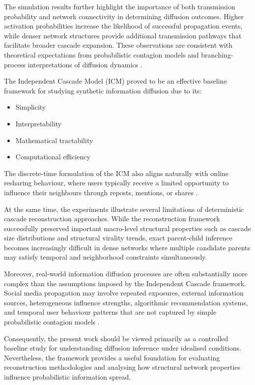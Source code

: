 \documentclass{article}
\begin{document}
\begin{enumerate}
The simulation results further highlight the importance of both transmission probability and network connectivity in determining diffusion outcomes. Higher activation probabilities increase the likelihood of successful propagation events, while denser network structures provide additional transmission pathways that facilitate broader cascade expansion. These observations are consistent with theoretical expectations from probabilistic contagion models and branching-process interpretations of diffusion dynamics \citep{watts2002simple,gleeson2020branching}.

The Independent Cascade Model (ICM) proved to be an effective baseline framework for studying synthetic information diffusion due to its:

\begin{itemize}
    \item Simplicity
    \item Interpretability
    \item Mathematical tractability
    \item Computational efficiency
\end{itemize}

The discrete-time formulation of the ICM also aligns naturally with online resharing behaviour, where users typically receive a limited opportunity to influence their neighbours through reposts, mentions, or shares \citep{kempe2003maximizing}.

At the same time, the experiments illustrate several limitations of deterministic cascade reconstruction approaches. While the reconstruction framework successfully preserved important macro-level structural properties such as cascade size distributions and structural virality trends, exact parent-child inference becomes increasingly difficult in dense networks where multiple candidate parents may satisfy temporal and neighborhood constraints simultaneously.

Moreover, real-world information diffusion processes are often substantially more complex than the assumptions imposed by the Independent Cascade framework. Social media propagation may involve repeated exposures, external information sources, heterogeneous influence strengths, algorithmic recommendation systems, and temporal user behaviour patterns that are not captured by simple probabilistic contagion models \citep{deverna2024information,cheng2014can}.

Consequently, the present work should be viewed primarily as a controlled baseline study for understanding diffusion inference under idealised conditions. Nevertheless, the framework provides a useful foundation for evaluating reconstruction methodologies and analysing how structural network properties influence probabilistic information spread.


\end{enumerate}
\end{document}
